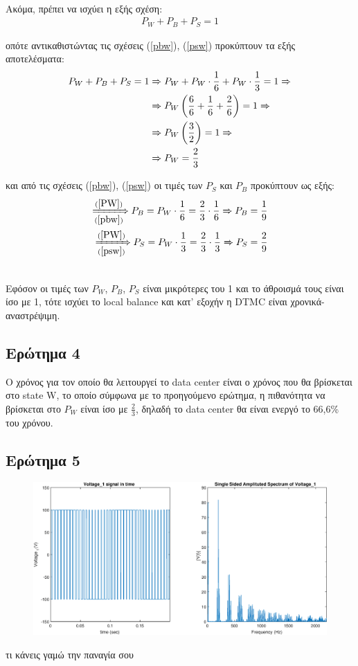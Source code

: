\noindent\\
Ακόμα, πρέπει να ισχύει η εξής σχέση:
\begin{align*}
	P_W + P_B + P_S = 1
\end{align*}

οπότε αντικαθιστώντας τις σχέσεις (\ref{pbw}), (\ref{psw}) προκύπτουν τα εξής αποτελέσματα:
\begin{align}
	P_W + P_B + P_S = 1 &\xRightarrow{} P_W + P_W \cdot \frac{1}{6} + P_W \cdot \frac{1}{3} = 1 \notag \xRightarrow{}\\
						&\xRightarrow{} P_W \left( \frac{6}{6} + \frac{1}{6} +  \frac{2}{6} \right) = 1 \notag \xRightarrow{}\\
						&\xRightarrow{} P_W \left( \frac{3}{2} \right) = 1 \notag \xRightarrow{}\\
						&\xRightarrow{} P_W = \frac{2}{3} \label{PW}
\end{align}

και από τις σχέσεις (\ref{pbw}), (\ref{psw}) οι τιμές των $P_S$ και $P_B$ προκύπτουν ως εξής:
\begin{align}
	\xRightarrow[(\ref{pbw})]{(\ref{PW})} P_B = P_W \cdot \frac{1}{6} = \frac{2}{3} \cdot \frac{1}{6} \xRightarrow{} P_B = \frac{1}{9}\\
	\xRightarrow[(\ref{psw})]{(\ref{PW})} P_S = P_W \cdot \frac{1}{3} = \frac{2}{3} \cdot \frac{1}{3} \xRightarrow{} P_S = \frac{2}{9}
\end{align}


\noindent\\
Εφόσον οι τιμές των $P_W$, $P_B$, $P_S$ είναι μικρότερες του 1 και το άθροισμά τους είναι ίσο με 1, τότε ισχύει το local balance και κατ' εξοχήν η DTMC είναι χρονικά-αναστρέψιμη.

\subsection*{Ερώτημα 4}
\label{ex2q4}

Ο χρόνος για τον οποίο θα λειτουργεί το data center είναι ο χρόνος που θα βρίσκεται στο state W, το οποίο σύμφωνα με το προηγούμενο ερώτημα, η πιθανότητα να βρίσκεται στο $P_W$ είναι ίσο με $\frac{2}{3}$, δηλαδή το data center θα είναι ενεργό το 66,6\% του χρόνου.


\subsection*{Ερώτημα 5}
\label{ex2q5}



\begin{figure}
	\includegraphics[width=\textwidth]{voltage1_Q3.eps} 
\end{figure} 

τι κάνεις γαμώ την παναγία σου 
